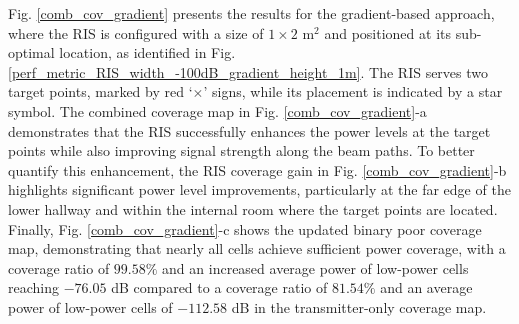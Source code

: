 \documentclass{IEEEoj}
\begin{document}
Fig. \ref{comb_cov_gradient} presents the results for the gradient-based approach, where the RIS is configured with a size of $1 \times 2$ m$^2$ and positioned at its sub-optimal location, as identified in Fig. \ref{perf_metric_RIS_width_-100dB_gradient_height_1m}. The RIS serves two target points, marked by red `$\times$' signs, while its placement is indicated by a star symbol. The combined coverage map in Fig. \ref{comb_cov_gradient}-a demonstrates that the RIS successfully enhances the power levels at the target points while also improving signal strength along the beam paths. To better quantify this enhancement, the RIS coverage gain in Fig. \ref{comb_cov_gradient}-b highlights significant power level improvements, particularly at the far edge of the lower hallway and within the internal room where the target points are located. Finally, Fig. \ref{comb_cov_gradient}-c shows the updated binary poor coverage map, demonstrating that nearly all cells achieve sufficient power coverage, with a coverage ratio of $99.58\%$ and an increased average power of low-power cells reaching $-76.05$ dB compared to a coverage ratio of $81.54\%$ and an average power of low-power cells of $-112.58$ dB in the transmitter-only coverage map.
\end{document}
